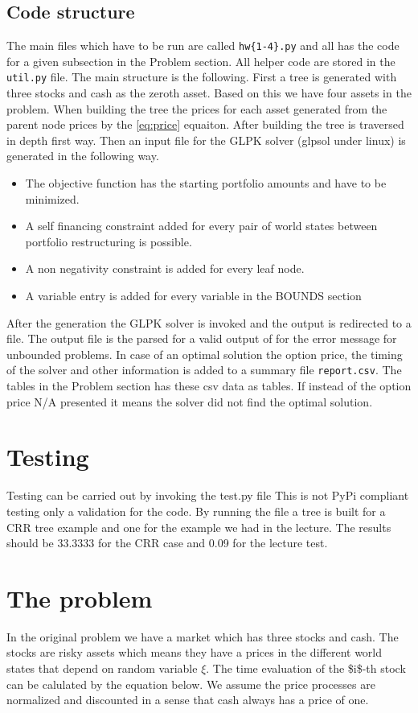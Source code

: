 \documentclass[11pt]{article}
\begin{document}
\subsection{Code structure}
The main files which have to be run are called \texttt{hw\{1-4\}.py} and all has the code for a given subsection in the Problem section. All helper code are stored in the \texttt{util.py} file. The main structure is the following. First a tree is generated with three stocks and cash as the zeroth asset. Based on this we have four assets in the problem. When building the tree the prices for each asset generated from the parent node prices by the \ref{eq:price} equaiton. After building the tree is traversed in depth first way. Then an input file for the GLPK solver (glpsol under linux) is generated in the following way. 
\begin{itemize}
\item The objective function has the starting portfolio amounts and have to be minimized.
\item A self financing constraint added for every pair of world states between portfolio restructuring is possible.
\item A non negativity constraint is added for every leaf node.
\item A variable entry is added for every variable in the BOUNDS section  
\end{itemize}
After the generation the GLPK solver is invoked and the output is redirected to a file. The output file is the parsed for a valid output of for the error message for unbounded problems. In case of an optimal solution the option price, the timing of the solver and other information is added to a summary file \texttt{report.csv}. The tables in the Problem section has these csv data as tables. If instead of the option price N/A presented it means the solver did not find the optimal solution.

\section{Testing}
Testing can be carried out by invoking the test.py file This is not PyPi compliant testing only a validation for the code. By running the file a tree is built for a CRR tree example and one for the example we had in the lecture. The results should be 33.3333 for the CRR case and 0.09 for the lecture test. 

\section{The problem}
In the original problem we have a market which has three stocks and cash. The stocks are risky assets which means they have a prices in the different world states that depend on random variable \(\xi\). The time evaluation of the \$i\$-th stock can be calulated by the equation below. We assume the price processes are normalized and discounted in a sense that cash always has a price of one. 
\end{document}
